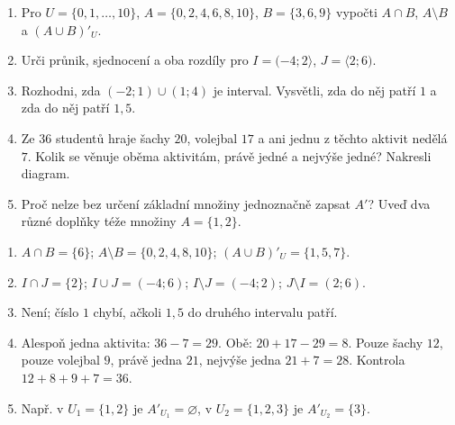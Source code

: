 \documentclass[11pt,a4paper]{article}
\begin{document}
\begin{zadaniReseniBox}[title={Domácí úkol}]
\begin{enumerate}[label=\arabic*)]
\item Pro $U=\{0,1,\ldots,10\}$, $A=\{0,2,4,6,8,10\}$,
$B=\{3,6,9\}$ vypočti $A\cap B$, $A\setminus B$ a $(A\cup B)'_U$.
\item Urči průnik, sjednocení a oba rozdíly pro
$I=(-4;2\rangle$, $J=\langle2;6)$.
\item Rozhodni, zda $(-2;1)\cup(1;4)$ je interval.
Vysvětli, zda do něj patří $1$ a zda do něj patří $1{,}5$.
\item Ze $36$ studentů hraje šachy $20$, volejbal $17$ a ani jednu
z těchto aktivit nedělá $7$. Kolik se věnuje oběma aktivitám,
právě jedné a nejvýše jedné? Nakresli diagram.
\item Proč nelze bez určení základní množiny jednoznačně zapsat $A'$?
Uveď dva různé doplňky téže množiny $A=\{1,2\}$.
\end{enumerate}
\tcblower
\begin{enumerate}[label=\arabic*)]
\item $A\cap B=\{6\}$;
$A\setminus B=\{0,2,4,8,10\}$;
$(A\cup B)'_U=\{1,5,7\}$.
\item $I\cap J=\{2\}$;
$I\cup J=(-4;6)$;
$I\setminus J=(-4;2)$;
$J\setminus I=(2;6)$.
\item Není; číslo $1$ chybí, ačkoli $1{,}5$ do druhého intervalu patří.
\item Alespoň jedna aktivita: $36-7=29$. Obě: $20+17-29=8$.
Pouze šachy $12$, pouze volejbal $9$, právě jedna $21$,
nejvýše jedna $21+7=28$. Kontrola $12+8+9+7=36$.
\item Např. v $U_1=\{1,2\}$ je $A'_{U_1}=\varnothing$,
v $U_2=\{1,2,3\}$ je $A'_{U_2}=\{3\}$.
\end{enumerate}
\end{zadaniReseniBox}

\end{document}
